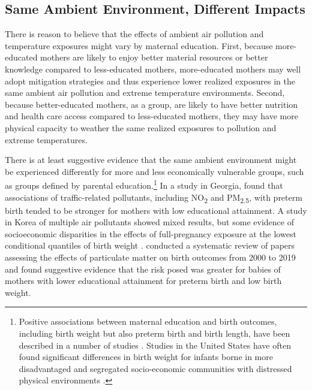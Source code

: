 \subsection{Same Ambient Environment, Different Impacts\label{same-ambient-environment-different-impacts}}
There is reason to believe that the effects of ambient air pollution and temperature exposures might vary by maternal education.  First, because more-educated mothers are likely to enjoy better material resources or better knowledge compared to less-educated mothers, more-educated mothers may well adopt mitigation strategies and thus experience lower realized exposures in the same ambient air pollution and extreme temperature environments.  Second, because better-educated mothers, as a group, are likely to have better nutrition and health care access compared to less-educated mothers, they may have more physical capacity to weather the same realized exposures to pollution and extreme temperatures.


There is at least suggestive evidence that the same ambient environment
might be experienced differently for more and less economically
vulnerable groups, such as groups defined by parental
education.\footnote{Positive associations between maternal education and
  birth outcomes, including birth weight but also preterm birth and birth
  length, have been described in a number of studies \autocite{abel_effects_2002, ballon_which_2019}. Studies in the United States have often found significant differences in birth weight for infants borne in more disadvantaged and segregated socio-economic communities with distressed physical environments \autocite{grady_racial_2006, kothari_interplay_2016}.} In a study in Georgia, \textcite{hao_air_2016}
found that associations of traffic-related pollutants, including NO\textsubscript{2} and
PM\textsubscript{2.5}, with preterm birth tended to be stronger for mothers with low
educational attainment. A study in Korea of multiple air
pollutants showed mixed results, but some evidence of socioeconomic disparities in the effects of full-pregnancy exposure at the lowest conditional quantiles of birth weight \autocite{lamichhane_quantile_2020}. \textcite{heo_risk_2019}
conducted a systematic review of papers assessing the effects of particulate
matter on birth outcomes from 2000 to 2019 and found suggestive evidence
that the risk posed was greater for babies of mothers with lower
educational attainment for preterm birth and low birth weight. 


